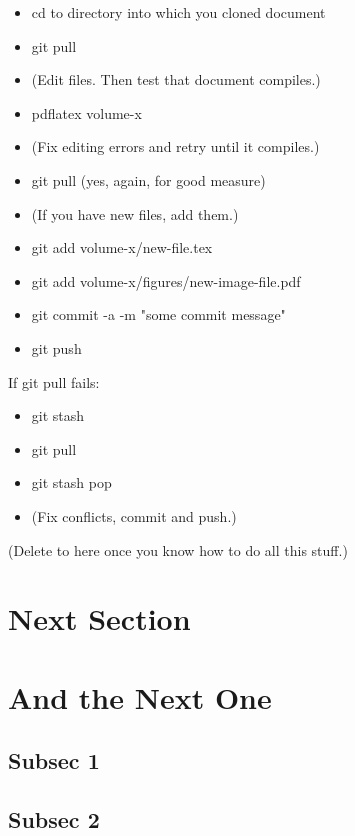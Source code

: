 \begin{itemize}
\item    cd to directory into which you cloned document
\item  git pull
\item    (Edit files. Then test that document compiles.)
\item    pdflatex volume-x
\item    (Fix editing errors and retry until it compiles.)
\item    git pull (yes, again, for good measure)
\item    (If you have new files, add them.)
\item    git add volume-x/new-file.tex
\item    git add volume-x/figures/new-image-file.pdf
\item    git commit -a -m "some commit message"
\item    git push
\end{itemize}

If git pull fails:

\begin{itemize}
\item       git stash
\item      git pull
\item      git stash pop
\item      (Fix conflicts, commit and push.)
\end{itemize}

(Delete to here once you know how to do all this stuff.)

\section{Next Section}

\section{And the Next One}

\subsection{Subsec 1}


\subsection{Subsec 2}


